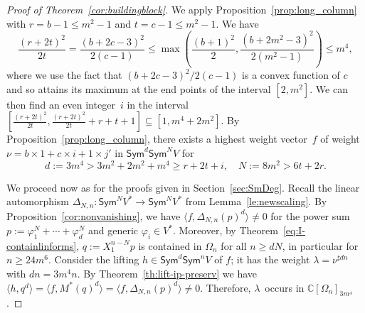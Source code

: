\documentclass[11pt]{amsart}
\def\Sym{\mathsf{Sym}}
\newcommand{\Det}{\Omega}
\def\la{\lambda}
\newcommand{\IC}{\ensuremath{\mathbb{C}}}
\numberwithin{equation}{section}
\begin{document}
\begin{proof}[Proof of Theorem~\ref{cor:buildingblock}]
We apply Proposition~\ref{prop:long_column} with $r=b-1 \leq m^2-1$ and $t=c-1\leq m^2-1$. 
We have 
$$\frac{ (r+2t)^2}{2t} = \frac{ (b+2c-3)^2}{2(c-1)} \leq 
 \max\left( \frac{(b+1)^2}{2}, \frac{ (b+2m^2-3)^2}{2(m^2-1)}\right ) 
 \leq m^4,
$$
where we use the fact that $(b+2c-3)^2/2(c-1)$ is a convex function of $c$ and so attains its maximum at 
the end points of the interval $[2,m^2]$. 
We can then find an even integer~$i$ in the interval 
$[ \frac{ (r+2t)^2}{2t}, \frac{(r+2t)^2}{2t} + r+t+1] 
  \subseteq [ 1, m^4+2m^2]$. 
By Proposition~\ref{prop:long_column}, there exists
a highest weight vector~$f$ of weight $\nu = b\times 1 + c \times i + 1\times j'$ 
in $\Sym^{d}\Sym^{N}V$ for 
$$
 d := 3m^4 > 3m^2 + 2m^2 + m^4 \ge r +2t + i,\quad  
N:= 8m^2 > 6t+2r .
$$ 

We proceed now as for the proofs given in Section~\ref{sec:SmDeg}.
Recall the linear automorphism 
$\Delta_{N,n}\colon \Sym^N V^* \to \Sym^N V^*$  
from Lemma~\ref{le:newscaling}. 
By Proposition~\ref{cor:nonvanishing},  we have
$\langle f, \Delta_{N,n}(p)^d \rangle \ne 0$
for the power sum 
$p :=\varphi_1^{N} + \cdots + \varphi_{d}^{N}$
and generic $\varphi_i\in V^*$.
Moreover, by Theorem~\ref{eq:I-containlinforms}, 
$q:=X_1^{n-N} p$ is contained in $\Det_n$ 
for all $n \geq d N $, in particular for $n \geq 24 m^6$. 
Consider the lifting $h\in\Sym^d\Sym^n V$ of $f$;
it has the weight $\la =\nu^{\sharp dn}$ %
with $dn=3m^4 n$.
By Theorem~\ref{th:lift-ip-preserv} we have 
$\langle h,q^d \rangle = \langle f, M^*(q)^d \rangle 
 = \langle f, \Delta_{N,n}(p)^d \rangle \ne 0$.
Therefore, $\la$~occurs in $\IC[\Det_n]_{3m^4}$.
\end{proof}
\end{document}

